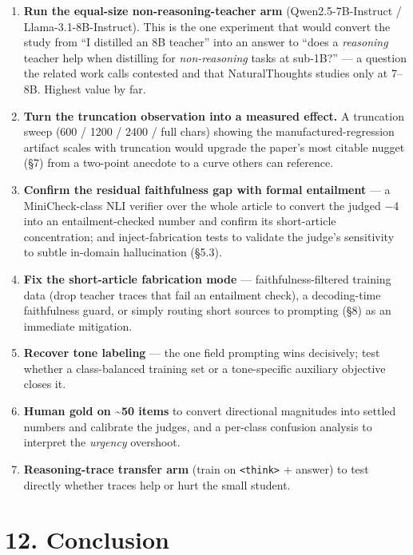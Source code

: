 \documentclass[11pt]{article}
\providecommand{\tightlist}{\setlength{\itemsep}{0pt}\setlength{\parskip}{0pt}}
\providecommand{\tightlist}{%
  \setlength{\itemsep}{0pt}\setlength{\parskip}{0pt}}
\begin{document}
\begin{enumerate}
\def\labelenumi{\arabic{enumi}.}
\tightlist
\item
  \textbf{Run the equal-size non-reasoning-teacher arm}
  (Qwen2.5-7B-Instruct / Llama-3.1-8B-Instruct). This is the one
  experiment that would convert the study from ``I distilled an 8B
  teacher'' into an answer to ``does a \emph{reasoning} teacher help
  when distilling for \emph{non-reasoning} tasks at sub-1B?'' --- a
  question the related work calls contested and that NaturalThoughts
  studies only at 7--8B. Highest value by far.
\item
  \textbf{Turn the truncation observation into a measured effect.} A
  truncation sweep (600 / 1200 / 2400 / full chars) showing the
  manufactured-regression artifact scales with truncation would upgrade
  the paper's most citable nugget (§7) from a two-point anecdote to a
  curve others can reference.
\item
  \textbf{Confirm the residual faithfulness gap with formal entailment}
  --- a MiniCheck-class NLI verifier over the whole article to convert
  the judged −4 into an entailment-checked number and confirm its
  short-article concentration; and inject-fabrication tests to validate
  the judge's sensitivity to subtle in-domain hallucination (§5.3).
\item
  \textbf{Fix the short-article fabrication mode} ---
  faithfulness-filtered training data (drop teacher traces that fail an
  entailment check), a decoding-time faithfulness guard, or simply
  routing short sources to prompting (§8) as an immediate mitigation.
\item
  \textbf{Recover tone labeling} --- the one field prompting wins
  decisively; test whether a class-balanced training set or a
  tone-specific auxiliary objective closes it.
\item
  \textbf{Human gold on \textasciitilde50 items} to convert directional
  magnitudes into settled numbers and calibrate the judges, and a
  per-class confusion analysis to interpret the \emph{urgency}
  overshoot.
\item
  \textbf{Reasoning-trace transfer arm} (train on
  \texttt{\textless{}think\textgreater{}} + answer) to test directly
  whether traces help or hurt the small student.
\end{enumerate}

\section{12. Conclusion}\label{conclusion}
\end{document}
